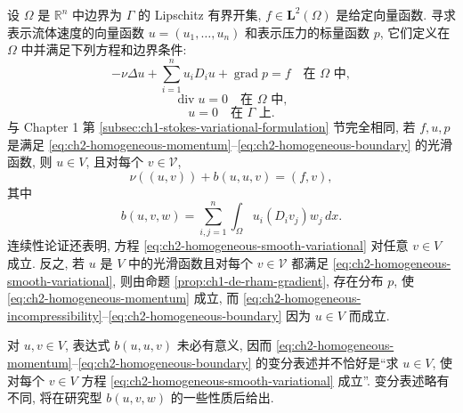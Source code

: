设 $\Omega$ 是 $\mathbb R^n$ 中边界为 $\Gamma$ 的 Lipschitz 有界开集, $f\in\mathbf L^2(\Omega)$ 是给定向量函数. 寻求表示流体速度的向量函数 $u=(u_1,\ldots,u_n)$ 和表示压力的标量函数 $p$, 它们定义在 $\Omega$ 中并满足下列方程和边界条件:
\begin{equation}
-\nu\Delta u+\sum_{i=1}^{n}u_iD_i u+\operatorname{grad}p=f
\quad\text{在 }\Omega\text{ 中},
\label{eq:ch2-homogeneous-momentum}
\end{equation}
\begin{equation}
\operatorname{div}u=0\quad\text{在 }\Omega\text{ 中},
\label{eq:ch2-homogeneous-incompressibility}
\end{equation}
\begin{equation}
u=0\quad\text{在 }\Gamma\text{ 上}.
\label{eq:ch2-homogeneous-boundary}
\end{equation}
与 Chapter 1 第 \ref{subsec:ch1-stokes-variational-formulation} 节完全相同, 若 $f,u,p$ 是满足 \eqref{eq:ch2-homogeneous-momentum}--\eqref{eq:ch2-homogeneous-boundary} 的光滑函数, 则 $u\in V$, 且对每个 $v\in\mathcal V$,
\begin{equation}
\nu((u,v))+b(u,u,v)=(f,v),
\label{eq:ch2-homogeneous-smooth-variational}
\end{equation}
其中
\begin{equation}
b(u,v,w)=\sum_{i,j=1}^{n}\int_\Omega u_i(D_iv_j)w_j\,dx.
\label{eq:ch2-trilinear-form-definition}
\end{equation}
连续性论证还表明, 方程 \eqref{eq:ch2-homogeneous-smooth-variational} 对任意 $v\in V$ 成立. 反之, 若 $u$ 是 $V$ 中的光滑函数且对每个 $v\in\mathcal V$ 都满足 \eqref{eq:ch2-homogeneous-smooth-variational}, 则由命题 \ref{prop:ch1-de-rham-gradient}, 存在分布 $p$, 使 \eqref{eq:ch2-homogeneous-momentum} 成立, 而 \eqref{eq:ch2-homogeneous-incompressibility}--\eqref{eq:ch2-homogeneous-boundary} 因为 $u\in V$ 而成立.

对 $u,v\in V$, 表达式 $b(u,u,v)$ 未必有意义, 因而 \eqref{eq:ch2-homogeneous-momentum}--\eqref{eq:ch2-homogeneous-boundary} 的变分表述并不恰好是``求 $u\in V$, 使对每个 $v\in V$ 方程 \eqref{eq:ch2-homogeneous-smooth-variational} 成立''. 变分表述略有不同, 将在研究型 $b(u,v,w)$ 的一些性质后给出.

